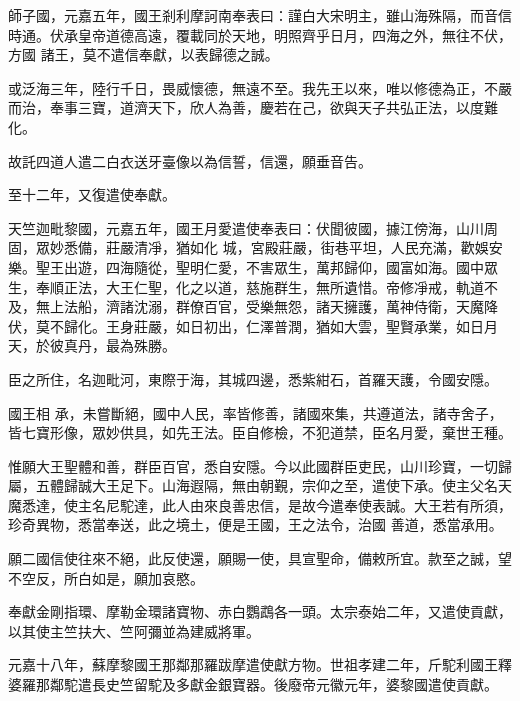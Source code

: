 \begin{pinyinscope}
 師子國，元嘉五年，國王剎利摩訶南奉表曰：謹白大宋明主，雖山海殊隔，而音信時通。伏承皇帝道德高遠，覆載同於天地，明照齊乎日月，四海之外，無往不伏，方國
 諸王，莫不遣信奉獻，以表歸德之誠。



 或泛海三年，陸行千日，畏威懷德，無遠不至。我先王以來，唯以修德為正，不嚴而治，奉事三寶，道濟天下，欣人為善，慶若在己，欲與天子共弘正法，以度難化。



 故託四道人遣二白衣送牙臺像以為信誓，信還，願垂音告。



 至十二年，又復遣使奉獻。



 天竺迦毗黎國，元嘉五年，國王月愛遣使奉表曰：伏聞彼國，據江傍海，山川周固，眾妙悉備，莊嚴清凈，猶如化
 城，宮殿莊嚴，街巷平坦，人民充滿，歡娛安樂。聖王出遊，四海隨從，聖明仁愛，不害眾生，萬邦歸仰，國富如海。國中眾生，奉順正法，大王仁聖，化之以道，慈施群生，無所遺惜。帝修凈戒，軌道不及，無上法船，濟諸沈溺，群僚百官，受樂無怨，諸天擁護，萬神侍衛，天魔降伏，莫不歸化。王身莊嚴，如日初出，仁澤普潤，猶如大雲，聖賢承業，如日月天，於彼真丹，最為殊勝。



 臣之所住，名迦毗河，東際于海，其城四邊，悉紫紺石，首羅天護，令國安隱。



 國王相
 承，未嘗斷絕，國中人民，率皆修善，諸國來集，共遵道法，諸寺舍子，皆七寶形像，眾妙供具，如先王法。臣自修檢，不犯道禁，臣名月愛，棄世王種。



 惟願大王聖體和善，群臣百官，悉自安隱。今以此國群臣吏民，山川珍寶，一切歸屬，五體歸誠大王足下。山海遐隔，無由朝覲，宗仰之至，遣使下承。使主父名天魔悉達，使主名尼駝達，此人由來良善忠信，是故今遣奉使表誠。大王若有所須，珍奇異物，悉當奉送，此之境土，便是王國，王之法令，治國
 善道，悉當承用。



 願二國信使往來不絕，此反使還，願賜一使，具宣聖命，備敕所宜。款至之誠，望不空反，所白如是，願加哀愍。



 奉獻金剛指環、摩勒金環諸寶物、赤白鸚鵡各一頭。太宗泰始二年，又遣使貢獻，以其使主竺扶大、竺阿彌並為建威將軍。



 元嘉十八年，蘇摩黎國王那鄰那羅跋摩遣使獻方物。世祖孝建二年，斤駝利國王釋婆羅那鄰駝遣長史竺留駝及多獻金銀寶器。後廢帝元徽元年，婆黎國遣使貢獻。




\end{pinyinscope}
